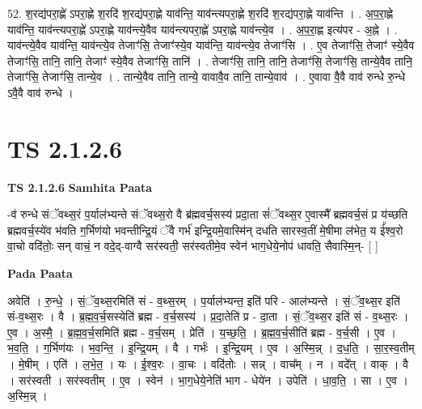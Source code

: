 \documentclass[17pt]{extarticle}
\begin{document}
52. श॒रद्य॑परा॒ह्णे॑ ऽपरा॒ह्णे श॒रदि॑ श॒रद्य॑परा॒ह्णे याव॑न्ति॒ याव॑न्त्यपरा॒ह्णे श॒रदि॑ श॒रद्य॑परा॒ह्णे याव॑न्ति । . अ॒प॒रा॒ह्णे याव॑न्ति॒ याव॑न्त्यपरा॒ह्णे॑ ऽपरा॒ह्णे याव॑न्त्ये॒वैव याव॑न्त्यपरा॒ह्णे॑ ऽपरा॒ह्णे याव॑न्त्ये॒व । . अ॒प॒रा॒ह्ण इत्य॑पर - अ॒ह्ने । . याव॑न्त्ये॒वैव याव॑न्ति॒ याव॑न्त्ये॒व तेजाꣳ॑सि॒ तेजाꣳ॑स्ये॒व याव॑न्ति॒ याव॑न्त्ये॒व तेजाꣳ॑सि । . ए॒व तेजाꣳ॑सि॒ तेजाꣳ॑ स्ये॒वैव तेजाꣳ॑सि॒ तानि॒ तानि॒ तेजाꣳ॑ स्ये॒वैव तेजाꣳ॑सि॒ तानि॑ । . तेजाꣳ॑सि॒ तानि॒ तानि॒ तेजाꣳ॑सि॒ तेजाꣳ॑सि॒ तान्ये॒वैव तानि॒ तेजाꣳ॑सि॒ तेजाꣳ॑सि॒ तान्ये॒व । . तान्ये॒वैव तानि॒ तान्ये॒ वावावै॒व तानि॒ तान्ये॒वाव॑ । . ए॒वावा वै॒वै वाव॑ रुन्धे रु॒न्धे ऽवै॒वै वाव॑ रुन्धे । \newline
\pagebreak
{}
\section*{ TS 2.1.2.6 }

\textbf{TS 2.1.2.6 } \newline
\textbf{Samhita Paata} \newline

-व॑ रुन्धे संॅवथ्स॒रं प॒र्याल॑भ्यन्ते संॅवथ्स॒रो वै ब्र॑ह्मवर्च॒सस्य॑ प्रदा॒ता सं॑ॅवथ्स॒र ए॒वास्मै᳚ ब्रह्मवर्च॒सं प्र य॑च्छति ब्रह्मवर्च॒स्ये॑व भ॑वति ग॒र्भिण॑यो भवन्तीन्द्रि॒यं ॅवै गर्भ॑ इन्द्रि॒यमे॒वास्मि॑न् दधति सारस्व॒तीं मे॒षीमा ल॑भेत॒ य ई᳚श्व॒रो वा॒चो वदि॑तोः॒ सन् वाचं॒ न वदे॒द्-वाग्वै सर॑स्वती॒ सर॑स्वतीमे॒व स्वेन॑ भाग॒धेये॒नोप॑ धावति॒ सैवास्मि॒न्-  [  ] \newline

\textbf{Pada Paata} \newline

अवेति॑ । रु॒न्धे॒ । सं॒ॅव॒थ्स॒रमिति॑ सं - व॒थ्स॒रम् । प॒र्याल॑भ्यन्त॒ इति॑ परि - आल॑भ्यन्ते । सं॒ॅव॒थ्स॒र इति॑ सं-व॒थ्स॒रः । वै । ब्र॒ह्म॒व॒र्च॒सस्येति॑ ब्रह्म - व॒र्च॒सस्य॑ । प्र॒दा॒तेति॑ प्र - दा॒ता । सं॒ॅव॒थ्स॒र इति॑ सं - व॒थ्स॒रः । ए॒व । अ॒स्मै॒ । ब्र॒ह्म॒व॒र्च॒समिति॑ ब्रह्म - व॒र्च॒सम् । प्रेति॑ । य॒च्छ॒ति॒ । ब्र॒ह्म॒व॒र्च॒सीति॑ ब्रह्म - व॒र्च॒सी । ए॒व । भ॒व॒ति॒ । ग॒र्भिण॑यः । भ॒व॒न्ति॒ । इ॒न्द्रि॒यम् । वै । गर्भः॑ । इ॒न्द्रि॒यम् । ए॒व । अ॒स्मि॒न्न् । द॒ध॒ति॒ । सा॒र॒स्व॒तीम् । मे॒षीम् । एति॑ । ल॒भे॒त॒ । यः । ई॒श्व॒रः । वा॒चः । वदि॑तोः । सन्न् । वाच᳚म् । न । वदे᳚त् । वाक् । वै । सर॑स्वती । सर॑स्वतीम् । ए॒व । स्वेन॑ । भा॒ग॒धेये॒नेति॑ भाग - धेये॑न । उपेति॑ । धा॒व॒ति॒ । सा । ए॒व । अ॒स्मि॒न्न् ।  \newline
\end{document}
